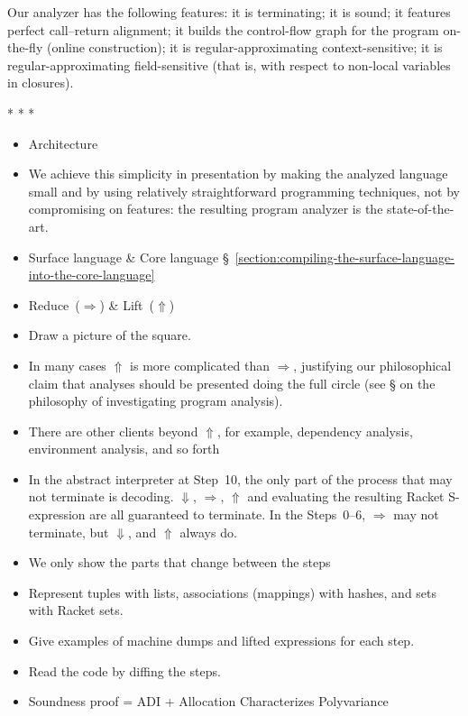 \documentclass[12pt, oneside]{book}
\begin{document}
Our analyzer has the following features: it is terminating; it is sound; it features perfect call–return alignment; it builds the control-flow graph for the program on-the-fly (online construction); it is regular-approximating context-sensitive; it is regular-approximating field-sensitive (that is, with respect to non-local variables in closures).


* * *

\begin{itemize}
  \item Architecture
  \item  We achieve this simplicity in presentation by making the analyzed language small and by using relatively straightforward programming techniques, not by compromising on features: the resulting program analyzer is the state-of-the-art.
  \item Surface language \& Core language §~\ref{section:compiling-the-surface-language-into-the-core-language}
  \item Reduce~(\(⇒\)) \& Lift~(\(⇑\))
  \item Draw a picture of the square.
  \item In many cases \(⇑\) is more complicated than \(⇒\), justifying our philosophical claim that analyses should be presented doing the full circle (see § on the philosophy of investigating program analysis).
  \item There are other clients beyond \(⇑\), for example, dependency analysis, environment analysis, and so forth
  \item In the abstract interpreter at Step~10, the only part of the process that may not terminate is decoding. \(⇓\), \(⇒\), \(⇑\) and evaluating the resulting Racket S-expression are all guaranteed to terminate. In the Steps~0–6, \(⇒\) may not terminate, but \(⇓\), and \(⇑\) always do.
  \item We only show the parts that change between the steps
  \item Represent tuples with lists, associations (mappings) with hashes, and sets with Racket sets.
  \item Give examples of machine dumps and lifted expressions for each step.
  \item Read the code by diffing the steps.
  \item Soundness proof = ADI + Allocation Characterizes Polyvariance
\end{itemize}
\end{document}
